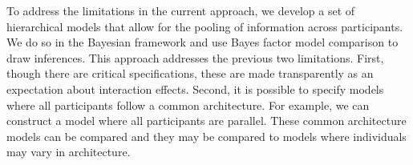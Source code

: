 \documentclass[fignum,nobf,man]{apa}
\begin{document}
To address the limitations in the current approach,
we develop a set of hierarchical models that allow for the pooling of
information across participants.  We do so in the Bayesian framework
and use Bayes factor model comparison to draw inferences.  This
approach addresses the previous two limitations.  First, though there are critical specifications, these are made
transparently as an expectation about interaction effects.  Second, it is possible to specify models where all participants follow a common architecture.  For example, we can construct a model where all participants are parallel.  These common architecture models can be compared and they may be compared to models where individuals may vary in architecture.  

\end{document}
